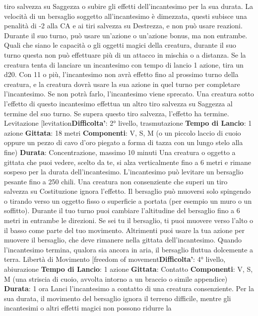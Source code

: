 \begin{multicols}{2}
tiro salvezza su Saggezza o subire gli effetti
dell’incantesimo per la sua durata.
La velocità di un bersaglio soggetto all’incantesimo è
dimezzata, questi subisce una penalità di -2 alla CA e ai
tiri salvezza su Destrezza, e non può usare reazioni.
Durante il suo turno, può usare un’azione o un’azione
bonus, ma non entrambe. Quali che siano le capacità o
gli oggetti magici della creatura, durante il suo turno
questa non può effettuare più di un attacco in mischia o
a distanza.
Se la creatura tenta di lanciare un incantesimo con
tempo di lancio 1 azione, tira un d20. Con 11 o più,
l’incantesimo non avrà effetto fino al prossimo turno
della creatura, e la creatura dovrà usare la sua azione
in quel turno per completare l’incantesimo. Se non potrà
farlo, l’incantesimo viene sprecato.
Una creatura sotto l’effetto di questo incantesimo
effettua un altro tiro salvezza su Saggezza al termine
del suo turno. Se supera questo tiro salvezza, l’effetto
ha termine.
Levitazione
[levitation\textbf{Difficolta'}:
2° livello, trasmutazione
\textbf{Tempo di Lancio}: 1 azione
\textbf{Gittata}: 18 metri
\textbf{Componenti}: V, S, M (o un piccolo laccio di cuoio
oppure un pezzo di cavo d’oro piegato a forma di tazza
con un lungo stelo alla fine)
\textbf{Durata}: Concentrazione, massimo 10 minuti
Una creatura o oggetto a gittata che puoi vedere, scelto
da te, si alza verticalmente fino a 6 metri e rimane
sospeso per la durata dell’incantesimo. L’incantesimo
può levitare un bersaglio pesante fino a 250 chili. Una
creatura non consenziente che superi un tiro salvezza
su Costituzione ignora l’effetto.
Il bersaglio può muoversi solo spingendo o tirando
verso un oggetto fisso o superficie a portata (per
esempio un muro o un soffitto). Durante il tuo turno puoi
cambiare l’altitudine del bersaglio fino a 6 metri in
entrambe le direzioni. Se sei tu il bersaglio, ti puoi
muovere verso l’alto o il basso come parte del tuo
movimento. Altrimenti puoi usare la tua azione per
muovere il bersaglio, che deve rimanere nella gittata
dell’incantesimo.
Quando l’incantesimo termina, qualora sia ancora in
aria, il bersaglio fluttua dolcemente a terra.
Libertà di Movimento
[freedom of movement\textbf{Difficolta'}:
4° livello, abiurazione
\textbf{Tempo di Lancio}: 1 azione
\textbf{Gittata}: Contatto
\textbf{Componenti}: V, S, M (una striscia di cuoio, avvolta
intorno a un braccio o simile appendice)
\textbf{Durata}: 1 ora
Lanci l’incantesimo a contatto di una creatura
consenziente. Per la sua durata, il movimento del
bersaglio ignora il terreno difficile, mentre gli
incantesimi o altri effetti magici non possono ridurre la

\end{multicols}

